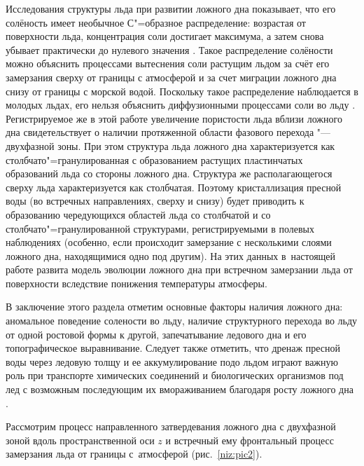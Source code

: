 Исследования структуры льда при развитии ложного дна показывает, что его солёность имеет необычное С"=образное распределение: возрастая от поверхности льда, концентрация соли достигает максимума, а затем снова убывает практически до нулевого значения \cite{niz:bib:7}. Такое распределение солёности можно объяснить процессами вытеснения соли растущим льдом за счёт его замерзания сверху от границы с атмосферой и за счет миграции ложного дна снизу от границы с морской водой. Поскольку такое распределение наблюдается в молодых льдах, его нельзя объяснить диффузионными процессами соли во льду \cite{niz:bib:7}. Регистрируемое же в этой работе увеличение пористости льда вблизи ложного дна свидетельствует о наличии протяженной области фазового перехода "--- двухфазной зоны. При этом структура льда ложного дна характеризуется как столбчато"=гранулированная с образованием растущих пластинчатых образований льда со стороны ложного дна. Структура же располагающегося сверху льда характеризуется как столбчатая. Поэтому кристаллизация пресной воды (во встречных направлениях, сверху и снизу) будет приводить к образованию чередующихся областей льда со столбчатой и со столбчато"=гранулированной структурами, регистрируемыми в полевых наблюдениях \cite{niz:bib:7} (особенно, если происходит замерзание с несколькими слоями ложного дна, находящимися одно под другим). На этих данных в~настоящей работе развита модель эволюции ложного дна при встречном замерзании льда от поверхности вследствие понижения температуры атмосферы.



В заключение этого раздела отметим основные факторы наличия ложного дна: аномальное поведение солености во льду, наличие структурного перехода во льду от одной ростовой формы к другой, запечатывание ледового дна и его топографическое выравнивание. Следует также отметить, что дренаж пресной воды через ледовую толщу и ее аккумулирование подо льдом играют важную роль при транспорте химических соединений и биологических организмов под лед с возможным последующим их вмораживанием благодаря росту ложного дна \cite{niz:bib:14}.



\smallskip



 Рассмотрим процесс направленного затвердевания ложного дна с двухфазной зоной вдоль пространственной оси $z$ и встречный ему фронтальный процесс замерзания льда от границы с~атмосферой (рис.~\ref{niz:pic2}).



